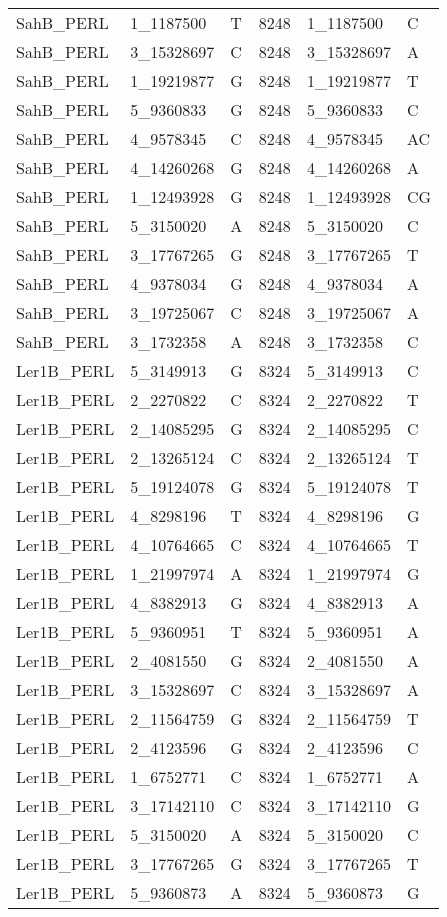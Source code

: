 \begin{center}
\begin{longtable}{|l|l|l|l|l|l|}
SahB\_PERL&1\_1187500&T&8248&1\_1187500&C\\
SahB\_PERL&3\_15328697&C&8248&3\_15328697&A\\
SahB\_PERL&1\_19219877&G&8248&1\_19219877&T\\
SahB\_PERL&5\_9360833&G&8248&5\_9360833&C\\
SahB\_PERL&4\_9578345&C&8248&4\_9578345&AC\\
SahB\_PERL&4\_14260268&G&8248&4\_14260268&A\\
SahB\_PERL&1\_12493928&G&8248&1\_12493928&CG\\
SahB\_PERL&5\_3150020&A&8248&5\_3150020&C\\
SahB\_PERL&3\_17767265&G&8248&3\_17767265&T\\
SahB\_PERL&4\_9378034&G&8248&4\_9378034&A\\
SahB\_PERL&3\_19725067&C&8248&3\_19725067&A\\
SahB\_PERL&3\_1732358&A&8248&3\_1732358&C\\
Ler1B\_PERL&5\_3149913&G&8324&5\_3149913&C\\
Ler1B\_PERL&2\_2270822&C&8324&2\_2270822&T\\
Ler1B\_PERL&2\_14085295&G&8324&2\_14085295&C\\
Ler1B\_PERL&2\_13265124&C&8324&2\_13265124&T\\
Ler1B\_PERL&5\_19124078&G&8324&5\_19124078&T\\
Ler1B\_PERL&4\_8298196&T&8324&4\_8298196&G\\
Ler1B\_PERL&4\_10764665&C&8324&4\_10764665&T\\
Ler1B\_PERL&1\_21997974&A&8324&1\_21997974&G\\
Ler1B\_PERL&4\_8382913&G&8324&4\_8382913&A\\
Ler1B\_PERL&5\_9360951&T&8324&5\_9360951&A\\
Ler1B\_PERL&2\_4081550&G&8324&2\_4081550&A\\
Ler1B\_PERL&3\_15328697&C&8324&3\_15328697&A\\
Ler1B\_PERL&2\_11564759&G&8324&2\_11564759&T\\
Ler1B\_PERL&2\_4123596&G&8324&2\_4123596&C\\
Ler1B\_PERL&1\_6752771&C&8324&1\_6752771&A\\
Ler1B\_PERL&3\_17142110&C&8324&3\_17142110&G\\
Ler1B\_PERL&5\_3150020&A&8324&5\_3150020&C\\
Ler1B\_PERL&3\_17767265&G&8324&3\_17767265&T\\
Ler1B\_PERL&5\_9360873&A&8324&5\_9360873&G\\

\end{longtable}
\end{center}
